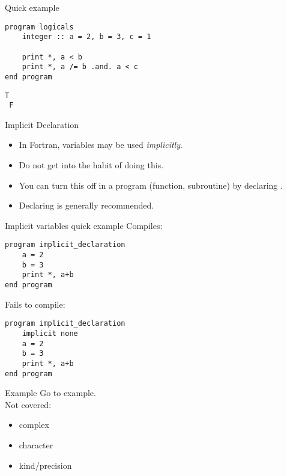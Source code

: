 \begin{frame}[fragile]
  \begin{block}{Quick example}\pause
\begin{lstlisting}
program logicals
    integer :: a = 2, b = 3, c = 1

    print *, a < b
    print *, a /= b .and. a < c
end program
\end{lstlisting}
\begin{lstlisting}[language=shl]
 T
 F
\end{lstlisting}
  \end{block}
\end{frame}

\begin{frame}
  \begin{block}{Implicit Declaration}\pause
  \begin{itemize}
    \item In Fortran, variables may be used \emph{implicitly}.
    \item Do not get into the habit of doing this.
    \item You can turn this off in a program (function, subroutine) by declaring .
    \item Declaring  is generally recommended.
  \end{itemize}
  \end{block}
\end{frame}

\begin{frame}[fragile]
  \begin{block}{Implicit variables quick example}\pause
Compiles:
\vspace*{-.4cm}
\begin{lstlisting}
program implicit_declaration
    a = 2
    b = 3
    print *, a+b
end program
\end{lstlisting}
Fails to compile:
\vspace*{-.4cm}
\begin{lstlisting}
program implicit_declaration
    implicit none
    a = 2
    b = 3
    print *, a+b
end program
\end{lstlisting}
  \end{block}
\end{frame}


\begin{frame}
  \begin{block}{Example}\pause
    Go to example.\\[.4cm]
    Not covered: 
    \begin{itemize}
      \item complex
      \item character
      \item kind/precision
    \end{itemize}
  \end{block}
\end{frame}

% 

